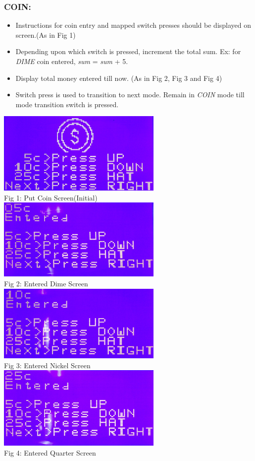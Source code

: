 \documentclass{article}
\begin{document}
\subsubsection{COIN:}
\begin{itemize}
    \item Instructions for coin entry and mapped switch presses should be displayed on screen.(As in Fig 1)
    \item Depending upon which switch is pressed, increment the total sum. Ex:
    for \textit{DIME} coin entered, \textit{sum} = \textit{sum} + 5.
    \item Display total money entered till now. (As in Fig 2, Fig 3 and Fig 4)
    \item Switch press is used to transition to next mode. Remain in \textit{COIN} mode till mode transition switch is pressed.
\end{itemize}
\begin{center}
   \includegraphics[width=8cm]{putcoin}
   \\Fig 1: Put Coin Screen(Initial)
   \\[2\baselineskip]
   \includegraphics[width=8cm]{coinfive}
   \\Fig 2: Entered Dime Screen
   \\[2\baselineskip]
   \includegraphics[width=8cm]{cointen}
   \\Fig 3: Entered Nickel Screen
   \\[2\baselineskip]
      \includegraphics[width=8cm]{coinentered}
   \\Fig 4: Entered Quarter Screen
   \\[2\baselineskip]
 \end{center}
\end{document}
